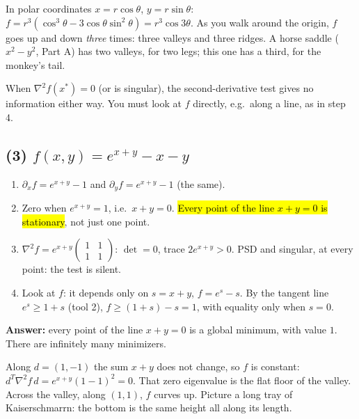 \begin{intuition}
In polar coordinates $x=r\cos\theta$, $y=r\sin\theta$: $f=r^3(\cos^3\theta-3\cos\theta\sin^2\theta)=r^3\cos3\theta$.
As you walk around the origin, $f$ goes up and down \emph{three} times: three valleys and three ridges. A horse saddle ($x^2-y^2$, Part A) has two valleys, for two legs;
this one has a third, for the monkey's tail.
\end{intuition}

\begin{pitfall}
When $\nabla^2f(x^*)=0$ (or is singular), the second-derivative test gives no information either way. You must look at $f$ directly, e.g.\ along a line, as in step 4.
\end{pitfall}

\subsection*{(3) $f(x,y)=e^{x+y}-x-y$}
\begin{enumerate}
  \item $\partial_xf=e^{x+y}-1$ and $\partial_yf=e^{x+y}-1$ (the same).
  \item Zero when $e^{x+y}=1$, i.e.\ $x+y=0$. \hl{Every point of the line $x+y=0$ is stationary}, not just one point.
  \item $\nabla^2f=e^{x+y}\begin{pmatrix}1&1\\1&1\end{pmatrix}$: $\det=0$, trace $2e^{x+y}>0$. PSD and singular, at every point: the test is silent.
  \item Look at $f$: it depends only on $s=x+y$, $f=e^s-s$. By the tangent line $e^s\ge1+s$ (tool 2), $f\ge(1+s)-s=1$, with equality only when $s=0$.
\end{enumerate}
\textbf{Answer:} every point of the line $x+y=0$ is a global minimum, with value $1$. There are infinitely many minimizers.

\begin{intuition}
Along $d=(1,-1)$ the sum $x+y$ does not change, so $f$ is constant: $d^T\nabla^2f\,d=e^{x+y}(1-1)^2=0$. That zero eigenvalue is the flat floor of the valley.
Across the valley, along $(1,1)$, $f$ curves up. Picture a long tray of Kaiserschmarrn: the bottom is the same height all along its length.
\end{intuition}


